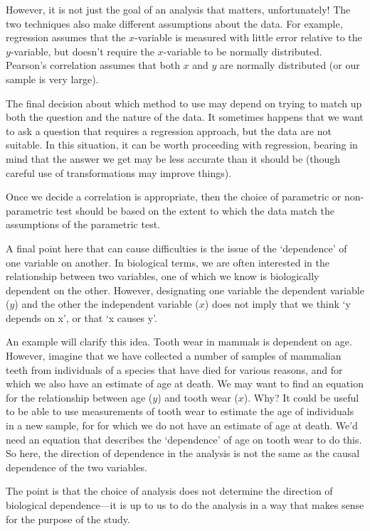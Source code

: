 \documentclass[
]{book}
\begin{document}
However, it is not just the goal of an analysis that matters, unfortunately! The two techniques also make different assumptions about the data. For example, regression assumes that the \(x\)-variable is measured with little error relative to the \(y\)-variable, but doesn't require the \(x\)-variable to be normally distributed. Pearson's correlation assumes that both \(x\) and \(y\) are normally distributed (or our sample is very large).

The final decision about which method to use may depend on trying to match up both the question and the nature of the data. It sometimes happens that we want to ask a question that requires a regression approach, but the data are not suitable. In this situation, it can be worth proceeding with regression, bearing in mind that the answer we get may be less accurate than it should be (though careful use of transformations may improve things).

Once we decide a correlation is appropriate, then the choice of parametric or non-parametric test should be based on the extent to which the data match the assumptions of the parametric test.

A final point here that can cause difficulties is the issue of the `dependence' of one variable on another. In biological terms, we are often interested in the relationship between two variables, one of which we know is biologically dependent on the other. However, designating one variable the dependent variable (\(y\)) and the other the independent variable (\(x\)) does not imply that we think `y depends on x', or that `x causes y'.

An example will clarify this idea. Tooth wear in mammals is dependent on age. However, imagine that we have collected a number of samples of mammalian teeth from individuals of a species that have died for various reasons, and for which we also have an estimate of age at death. We may want to find an equation for the relationship between age (\(y\)) and tooth wear (\(x\)). Why? It could be useful to be able to use measurements of tooth wear to estimate the age of individuals in a new sample, for for which we do not have an estimate of age at death. We'd need an equation that describes the `dependence' of age on tooth wear to do this. So here, the direction of dependence in the analysis is not the same as the causal dependence of the two variables.

The point is that the choice of analysis does not determine the direction of biological dependence---it is up to us to do the analysis in a way that makes sense for the purpose of the study.
\end{document}
